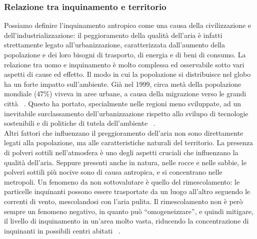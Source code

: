\subsubsection{Relazione tra inquinamento e territorio}
Possiamo definire l'inquinamento antropico come una causa della civilizzazione e dell'industrializzazione: il peggioramento della qualità dell'aria è infatti strettamente legato all'urbanizzazione, caratterizzata dall'aumento della popolazione e dei loro bisogni di trasporto, di energia e di beni di consumo.
La relazione tra uomo e inquinamento è molto complessa ed osservabile sotto vari aspetti di cause ed effetto.
Il modo in cui la popolazione si distribuisce nel globo ha un forte impatto sull'ambiente.
Già nel 1999, circa metà della popolazione mondiale (47\%) viveva in aree urbane, a causa della migrazione verso le grandi città ~\cite{population_and_enviroment}.
Questo ha portato, specialmente nelle regioni meno sviluppate, ad un inevitabile surclassamento dell'urbanizzazione rispetto allo svilupo di tecnologie sostenibili e di politiche di tutela dell'ambiente ~\cite{population_and_enviroment}.
\\
Altri fattori che influenzano il preggioramento dell'aria non sono direttamente legati alla popolazione, ma alle caratteristiche naturali del territorio.
La presenza di polveri sottili nell'atmosfera è uno degli aspetti cruciali che influenzano la qualità dell'aria.
Seppure presenti anche in natura, nelle rocce e nelle sabbie, le polveri sottili più nocive sono di causa antropica, e si concentrano nelle metropoli.
Un fenomeno da non sottovalutare è quello del rimescolamento: le particelle inquinanti possono essere trasportate da un luogo all'altro seguendo le correnti di vento, mescolandosi con l'aria pulita.
Il rimescolamento non è però sempre un fenomeno negativo, in quanto può “omogeneizzare”, e quindi mitigare, il livello di inquinamento in un'area molto vasta, riducendo la concentrazione di inquinanti in possibili centri abitati ~\cite{la_mincrometrologia}.

